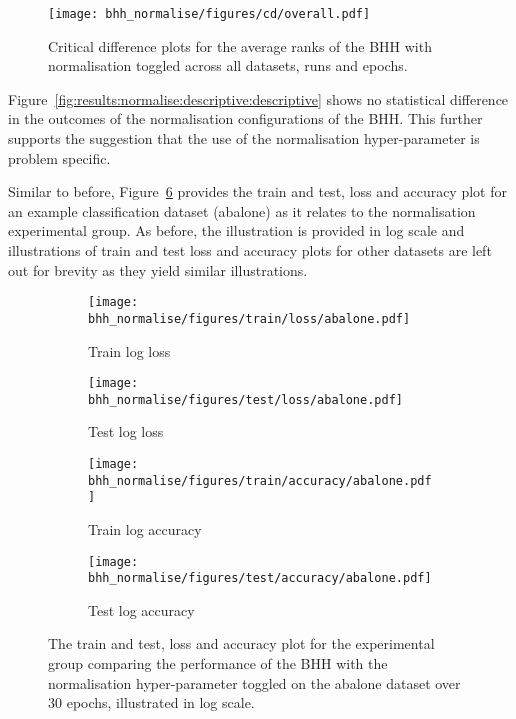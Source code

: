 \begin{figure}[htbp]
	\centering
	\texttt{[image: bhh\_normalise/figures/cd/overall.pdf]}
	\caption{Critical difference plots for the average ranks of the \acs{BHH} with normalisation toggled across all datasets, runs and epochs.}
	\label{fig:results:normalise:descriptive:cd}
\end{figure}

Figure~\ref{fig:results:normalise:descriptive:descriptive} shows no statistical difference in the outcomes of the normalisation configurations of the \acs{BHH}. This further supports the suggestion that the use of the normalisation hyper-parameter is problem specific.

Similar to before, Figure~\ref{fig:results:normalise:figures:abalone} provides the train and test, loss and accuracy plot for an example classification dataset (abalone) as it relates to the normalisation experimental group. As before, the illustration is provided in log scale and illustrations of train and test loss and accuracy plots for other datasets are left out for brevity as they yield similar illustrations.

\begin{figure}[htbp]
	\begin{subfigure}{0.5\textwidth}
		\centering
		\texttt{[image: bhh\_normalise/figures/train/loss/abalone.pdf]}
		\caption{Train log loss}
		\label{fig:results:normalise:figures:loss:train:abalone}
	\end{subfigure}
	\begin{subfigure}{0.5\textwidth}
		\centering
		\texttt{[image: bhh\_normalise/figures/test/loss/abalone.pdf]}
		\caption{Test log loss}
		\label{fig:results:normalise:figures:loss:test:abalone}
	\end{subfigure}
	\par\bigskip
	\begin{subfigure}{0.5\textwidth}
		\centering
		\texttt{[image: bhh\_normalise/figures/train/accuracy/abalone.pdf]}
		\caption{Train log accuracy}
		\label{fig:results:normalise:figures:accuracy:train:abalone}
	\end{subfigure}
	\begin{subfigure}{0.5\textwidth}
		\centering
		\texttt{[image: bhh\_normalise/figures/test/accuracy/abalone.pdf]}
		\caption{Test log accuracy}
		\label{fig:results:normalise:figures:accuracy:test:abalone}
	\end{subfigure}
	\par\bigskip
	\caption{The train and test, loss and accuracy plot for the experimental group comparing the performance of the \acs{BHH} with the normalisation hyper-parameter toggled on the abalone dataset over 30 epochs, illustrated in log scale.}
	\label{fig:results:normalise:figures:abalone}
\end{figure}


